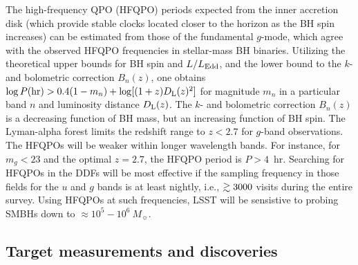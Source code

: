 The high-frequency QPO (HFQPO) periods expected from the inner accretion disk
(which provide stable clocks located closer to the horizon as the BH spin increases)
can be estimated from those of the fundamental $g$-mode, which agree with
the observed HFQPO frequencies in stellar-mass BH binaries. Utilizing the
theoretical upper bounds for BH spin and $L/L_{\rm Edd}$, and the lower
bound to the $k$- and bolometric correction $B_n(z)$, one obtains
$\log P({\rm hr}) > 0.4(1-m_n) + \log[(1+z)D_{\rm L}(z)^2]$ for magnitude
$m_n$ in a particular band $n$ and luminosity distance $D_{\rm L}(z)$.
The $k$- and bolometric correction $B_n(z)$ is a decreasing function of BH mass,
but an increasing function of BH spin. The Lyman-alpha forest limits the redshift
range to $z < 2.7$ for $g$-band observations. The HFQPOs will be weaker within longer
wavelength bands.
For instance, for $m_g  <  23$ and the optimal $z =  2.7$, the HFQPO period is $P > 4$~hr.
%
Searching for HFQPOs in the DDFs will be most effective if the sampling frequency
in those fields for the $u$ and $g$ bands is at least nightly, i.e., $\gtrsim3000$
visits during the entire survey. Using HFQPOs at such frequencies, LSST will be
sensistive to probing SMBHs down to $\approx10^{5} - 10^{6}~M_{\sun}$. 



\subsection{Target measurements and discoveries}
\label{sec:\secname:targets}


